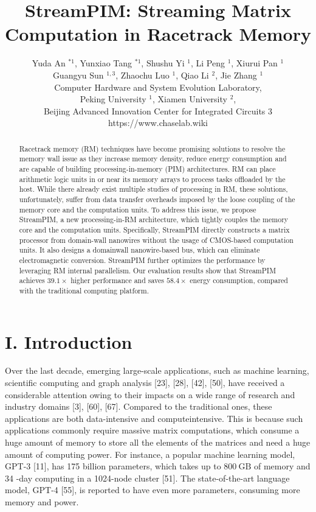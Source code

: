 \documentclass[10pt]{article}
\title{StreamPIM: Streaming Matrix Computation in Racetrack Memory }
\author{Yuda An $^{* 1}$, Yunxiao Tang ${ }^{* 1}$, Shushu Yi $^{1}$, Li Peng ${ }^{1}$, Xiurui Pan ${ }^{1}$\\
Guangyu Sun ${ }^{1,3}$, Zhaochu Luo ${ }^{1}$, Qiao Li $^{2}$, Jie Zhang ${ }^{1}$\\
Computer Hardware and System Evolution Laboratory,\\
Peking University ${ }^{1}$, Xiamen University ${ }^{2}$,\\
Beijing Advanced Innovation Center for Integrated Circuits 3\\
https://www.chaselab.wiki}
\date{}
\begin{document}
\maketitle


\begin{abstract}
Racetrack memory (RM) techniques have become promising solutions to resolve the memory wall issue as they increase memory density, reduce energy consumption and are capable of building processing-in-memory (PIM) architectures. RM can place arithmetic logic units in or near its memory arrays to process tasks offloaded by the host. While there already exist multiple studies of processing in RM, these solutions, unfortunately, suffer from data transfer overheads imposed by the loose coupling of the memory core and the computation units. To address this issue, we propose StreamPIM, a new processing-in-RM architecture, which tightly couples the memory core and the computation units. Specifically, StreamPIM directly constructs a matrix processor from domain-wall nanowires without the usage of CMOS-based computation units. It also designs a domainwall nanowire-based bus, which can eliminate electromagnetic conversion. StreamPIM further optimizes the performance by leveraging RM internal parallelism. Our evaluation results show that StreamPIM achieves $39.1 \times$ higher performance and saves $58.4 \times$ energy consumption, compared with the traditional computing platform.
\end{abstract}

\section*{I. Introduction}
Over the last decade, emerging large-scale applications, such as machine learning, scientific computing and graph analysis [23], [28], [42], [50], have received a considerable attention owing to their impacts on a wide range of research and industry domains [3], [60], [67]. Compared to the traditional ones, these applications are both data-intensive and computeintensive. This is because such applications commonly require massive matrix computations, which consume a huge amount of memory to store all the elements of the matrices and need a huge amount of computing power. For instance, a popular machine learning model, GPT-3 [11], has 175 billion parameters, which takes up to $800 \mathrm{~GB}$ of memory and 34 -day computing in a 1024-node cluster [51]. The state-of-the-art language model, GPT-4 [55], is reported to have even more parameters, consuming more memory and power.
\end{document}
